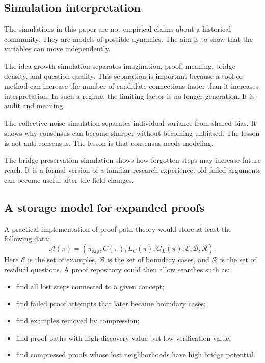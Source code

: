 \documentclass[11pt]{article}
\theoremstyle{definition}
\theoremstyle{remark}
\begin{document}
\subsection{Simulation interpretation}

The simulations in this paper are not empirical claims about a historical community.  They are models of possible dynamics.  The aim is to show that the variables can move independently.

The idea-growth simulation separates imagination, proof, meaning, bridge density, and question quality.  This separation is important because a tool or method can increase the number of candidate connections faster than it increases interpretation.  In such a regime, the limiting factor is no longer generation.  It is audit and meaning.

The collective-noise simulation separates individual variance from shared bias.  It shows why consensus can become sharper without becoming unbiased.  The lesson is not anti-consensus.  The lesson is that consensus needs modeling.

The bridge-preservation simulation shows how forgotten steps may increase future reach.  It is a formal version of a familiar research experience: old failed arguments can become useful after the field changes.

\subsection{A storage model for expanded proofs}

A practical implementation of proof-path theory would store at least the following data:
\[
        \mathcal A(\pi)=
        (\pi_{\mathrm{exp}}, C(\pi), L_C(\pi), G_L(\pi), \mathcal E, \mathcal B, \mathcal R).
\]
Here $\mathcal E$ is the set of examples, $\mathcal B$ is the set of boundary cases, and $\mathcal R$ is the set of residual questions.  A proof repository could then allow searches such as:
\begin{itemize}
\item find all lost steps connected to a given concept;
\item find failed proof attempts that later became boundary cases;
\item find examples removed by compression;
\item find proof paths with high discovery value but low verification value;
\item find compressed proofs whose lost neighborhoods have high bridge potential.
\end{itemize}
\end{document}

